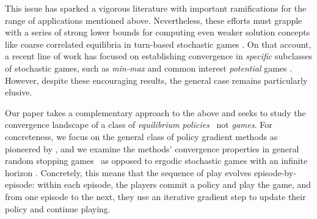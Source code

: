 
This issue has sparked a vigorous literature with important ramifications for the range of applications mentioned above.
Nevertheless, these efforts must grapple with a series of strong lower bounds for computing even weaker solution concepts like coarse correlated equilibria in turn-based stochastic games \cite{daskalakis2022complexity, Yujia22:The}.
On that account, a recent line of work has focused on establishing convergence in \emph{specific} subclasses of stochastic games, such as \emph{min-max} \cite{LPX20,daskalakis2020independent,Wei21:Last,Sayin20:Fictitious,Sayin21:Decentralized,Cen21:Fast} and common interest \emph{potential} games \cite{LOPP22,ding2022independent,zhang2021gradient}.
However, despite these encouraging results, the general case remains particularly elusive.

Our paper takes a complementary approach to the above and seeks to study the convergence landscape of a class of \emph{equilibrium policies} \textendash\ not \emph{games}.
For concreteness, we focus on the general class of policy gradient methods as pioneered by \cite{sutton1999policy,williams1992simple,kakade2001natural,konda1999actor}, and we examine the methods' convergence properties in general random stopping games \textendash\ as opposed to ergodic stochastic games with an infinite horizon \cite{Per13,LPX20}.
Concretely, this means that the sequence of play evolves episode-by-episode:
within each episode, the players commit a policy and play the game, and from one episode to the next, they use an iterative gradient step to update their policy and continue playing.


